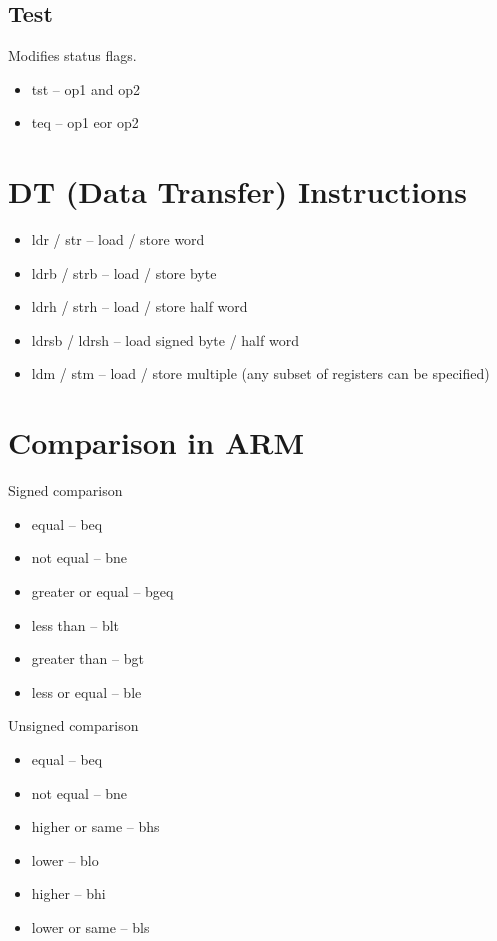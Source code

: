\documentclass{scrartcl}
\begin{document}
\subsection{Test}
Modifies status flags.
\begin{itemize}
	\item tst -- op1 and op2
	\item teq -- op1 eor op2
\end{itemize}

\section{DT (Data Transfer) Instructions}
\begin{itemize}
	\item ldr / str -- load / store word
	\item ldrb / strb -- load / store byte
	\item ldrh / strh -- load / store half word
	\item ldrsb / ldrsh -- load signed byte / half word
	\item ldm / stm -- load / store multiple (any subset of registers can be specified)
\end{itemize}

\section{Comparison in ARM}
Signed comparison
\begin{itemize}
	\item equal -- beq
	\item not equal -- bne
	\item greater or equal -- bgeq
	\item less than -- blt
	\item greater than -- bgt
	\item less or equal -- ble
\end{itemize}

Unsigned comparison
\begin{itemize}
	\item equal -- beq
	\item not equal -- bne
	\item higher or same -- bhs
	\item lower -- blo
	\item higher -- bhi
	\item lower or same -- bls
\end{itemize}
\end{document}
